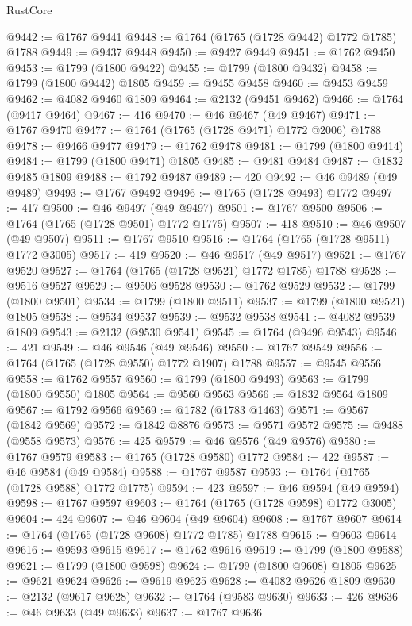 \begin{lexlean}{RustCore}
\begin{coremodule}
@9442 := @1767 @9441
@9448 := @1764 (@1765 (@1728 @9442) @1772 @1785) @1788
@9449 := @9437 @9448
@9450 := @9427 @9449
@9451 := @1762 @9450
@9453 := @1799 (@1800 @9422)
@9455 := @1799 (@1800 @9432)
@9458 := @1799 (@1800 @9442) @1805
@9459 := @9455 @9458
@9460 := @9453 @9459
@9462 := @4082 @9460 @1809
@9464 := @2132 (@9451 @9462)
@9466 := @1764 (@9417 @9464)
@9467 := 416
@9470 := @46 @9467 (@49 @9467)
@9471 := @1767 @9470
@9477 := @1764 (@1765 (@1728 @9471) @1772 @2006) @1788
@9478 := @9466 @9477
@9479 := @1762 @9478
@9481 := @1799 (@1800 @9414)
@9484 := @1799 (@1800 @9471) @1805
@9485 := @9481 @9484
@9487 := @1832 @9485 @1809
@9488 := @1792 @9487
@9489 := 420
@9492 := @46 @9489 (@49 @9489)
@9493 := @1767 @9492
@9496 := @1765 (@1728 @9493) @1772
@9497 := 417
@9500 := @46 @9497 (@49 @9497)
@9501 := @1767 @9500
@9506 := @1764 (@1765 (@1728 @9501) @1772 @1775)
@9507 := 418
@9510 := @46 @9507 (@49 @9507)
@9511 := @1767 @9510
@9516 := @1764 (@1765 (@1728 @9511) @1772 @3005)
@9517 := 419
@9520 := @46 @9517 (@49 @9517)
@9521 := @1767 @9520
@9527 := @1764 (@1765 (@1728 @9521) @1772 @1785) @1788
@9528 := @9516 @9527
@9529 := @9506 @9528
@9530 := @1762 @9529
@9532 := @1799 (@1800 @9501)
@9534 := @1799 (@1800 @9511)
@9537 := @1799 (@1800 @9521) @1805
@9538 := @9534 @9537
@9539 := @9532 @9538
@9541 := @4082 @9539 @1809
@9543 := @2132 (@9530 @9541)
@9545 := @1764 (@9496 @9543)
@9546 := 421
@9549 := @46 @9546 (@49 @9546)
@9550 := @1767 @9549
@9556 := @1764 (@1765 (@1728 @9550) @1772 @1907) @1788
@9557 := @9545 @9556
@9558 := @1762 @9557
@9560 := @1799 (@1800 @9493)
@9563 := @1799 (@1800 @9550) @1805
@9564 := @9560 @9563
@9566 := @1832 @9564 @1809
@9567 := @1792 @9566
@9569 := @1782 (@1783 @1463)
@9571 := @9567 (@1842 @9569)
@9572 := @1842 @8876
@9573 := @9571 @9572
@9575 := @9488 (@9558 @9573)
@9576 := 425
@9579 := @46 @9576 (@49 @9576)
@9580 := @1767 @9579
@9583 := @1765 (@1728 @9580) @1772
@9584 := 422
@9587 := @46 @9584 (@49 @9584)
@9588 := @1767 @9587
@9593 := @1764 (@1765 (@1728 @9588) @1772 @1775)
@9594 := 423
@9597 := @46 @9594 (@49 @9594)
@9598 := @1767 @9597
@9603 := @1764 (@1765 (@1728 @9598) @1772 @3005)
@9604 := 424
@9607 := @46 @9604 (@49 @9604)
@9608 := @1767 @9607
@9614 := @1764 (@1765 (@1728 @9608) @1772 @1785) @1788
@9615 := @9603 @9614
@9616 := @9593 @9615
@9617 := @1762 @9616
@9619 := @1799 (@1800 @9588)
@9621 := @1799 (@1800 @9598)
@9624 := @1799 (@1800 @9608) @1805
@9625 := @9621 @9624
@9626 := @9619 @9625
@9628 := @4082 @9626 @1809
@9630 := @2132 (@9617 @9628)
@9632 := @1764 (@9583 @9630)
@9633 := 426
@9636 := @46 @9633 (@49 @9633)
@9637 := @1767 @9636

\end{coremodule}
\end{lexlean}
